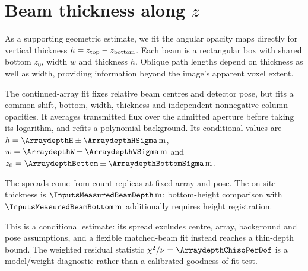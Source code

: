 \section{Beam thickness along \texorpdfstring{$z$}{z}}\label{sec:depth}
As a supporting geometric estimate, we fit the angular opacity maps directly for vertical thickness $h=z_{\rm top}-z_{\rm bottom}$. Each beam is a rectangular box with shared bottom $z_0$, width $w$ and thickness $h$. Oblique path lengths depend on thickness as well as width, providing information beyond the image's apparent voxel extent.

The continued-array fit fixes relative beam centres and detector pose, but fits a common shift, bottom, width, thickness and independent nonnegative column opacities. It averages transmitted flux over the admitted aperture before taking its logarithm, and refits a polynomial background. Its conditional values are $h=\ArraydepthH\pm\ArraydepthHSigma\,\mathrm{m}$, $w=\ArraydepthW\pm\ArraydepthWSigma\,\mathrm{m}$ and $z_0=\ArraydepthBottom\pm\ArraydepthBottomSigma\,\mathrm{m}$.

The spreads come from \ArraydepthNReplicas{} count replicas at fixed array and pose. The on-site thickness is $\InputsMeasuredBeamDepth\,\mathrm{m}$; bottom-height comparison with $\InputsMeasuredBeamBottom\,\mathrm{m}$ additionally requires height registration.

This is a conditional estimate: its spread excludes centre, array, background and pose assumptions, and a flexible matched-beam fit instead reaches a thin-depth bound. The weighted residual statistic $\chi^2/\nu=\ArraydepthChisqPerDof$ is a model/weight diagnostic rather than a calibrated goodness-of-fit test.
